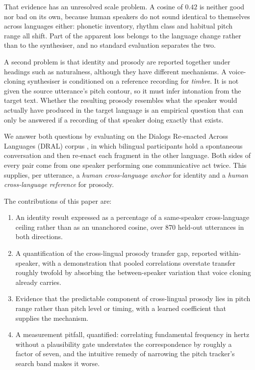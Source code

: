 \documentclass[journal]{IEEEtran}
\begin{document}
That evidence has an unresolved scale problem. A cosine of $0.42$ is neither good nor bad on its
own, because human speakers do not sound identical to themselves across languages either: phonetic
inventory, rhythm class and habitual pitch range all shift. Part of the apparent loss belongs to
the language change rather than to the synthesiser, and no standard evaluation separates the two.

A second problem is that identity and prosody are reported together under headings such as
naturalness, although they have different mechanisms. A voice-cloning synthesiser is conditioned on
a reference recording for \emph{timbre}. It is not given the source utterance's pitch contour, so
it must infer intonation from the target text. Whether the resulting prosody resembles what the
speaker would actually have produced in the target language is an empirical question that can only
be answered if a recording of that speaker doing exactly that exists.

We answer both questions by evaluating on the Dialogs Re-enacted Across Languages (DRAL) corpus
\cite{ward2023dral}, in which bilingual participants hold a spontaneous conversation and then
re-enact each fragment in the other language. Both sides of every pair come from one speaker
performing one communicative act twice. This supplies, per utterance, a \emph{human cross-language
anchor} for identity and a \emph{human cross-language reference} for prosody.

The contributions of this paper are:

\begin{enumerate}
\item An identity result expressed as a percentage of a same-speaker cross-language ceiling rather
      than as an unanchored cosine, over 870 held-out utterances in both directions.
\item A quantification of the cross-lingual prosody transfer gap, reported within-speaker, with a
      demonstration that pooled correlations overstate transfer roughly twofold by absorbing the
      between-speaker variation that voice cloning already carries.
\item Evidence that the predictable component of cross-lingual prosody lies in pitch range rather
      than pitch level or timing, with a learned coefficient that supplies the mechanism.
\item A measurement pitfall, quantified: correlating fundamental frequency in hertz without a
      plausibility gate understates the correspondence by roughly a factor of seven, and the
      intuitive remedy of narrowing the pitch tracker's search band makes it worse.
\end{enumerate}
\end{document}
